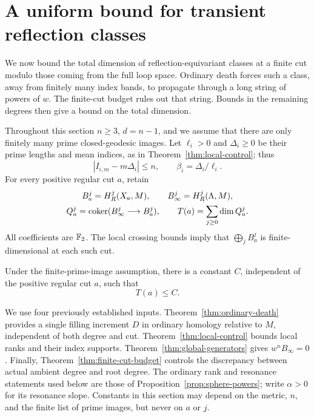 \section{A uniform bound for transient reflection classes}\label{sec:transients}

We now bound the total dimension of reflection-equivariant classes at a
finite cut modulo those coming from the full loop space.  Ordinary death
forces such a class, away from finitely many index bands, to propagate
through a long string of powers of $w$.  The finite-cut budget rules out
that string.  Bounds in the remaining degrees then give a bound on the
total dimension.

Throughout this section $n\ge3$, $d=n-1$, and we assume that there are
only finitely many prime closed-geodesic images.  Let $\ell_i>0$ and
$\Delta_i\ge0$ be their prime lengths and mean indices, as in
Theorem~\ref{thm:local-control}; thus
\begin{equation}\label{trans:index-slope}
 |I_{i,m}-m\Delta_i|\le n,
 \qquad \beta_i=\Delta_i/\ell_i.
\end{equation}
For every positive regular cut $a$, retain
\[
 \begin{gathered}
 B_a^j=H_R^j(X_a,M),\qquad B_\infty^j=H_R^j(\Lambda,M),\\
 Q_a^j=\operatorname{coker}(B_\infty^j\longrightarrow B_a^j),
 \qquad T(a)=\sum_{j\ge0}\dim Q_a^j.
 \end{gathered}
\]
All coefficients are $\mathbb F_2$.  The local crossing bounds imply that
$\bigoplus_j B_a^j$ is finite-dimensional at each such cut.

\begin{theorem}\label{thm:bounded-transients}
Under the finite-prime-image assumption, there is a constant $C$,
independent of the positive regular cut $a$, such that
\begin{equation}\label{trans:total-bound}
 T(a)\le C.
\end{equation}
\end{theorem}

We use four previously established inputs.  Theorem~\ref{thm:ordinary-death}
provides a single filling increment $D$ in ordinary homology relative
to $M$, independent of both degree and cut.
Theorem~\ref{thm:local-control} bounds local ranks and their index
supports.  Theorem~\ref{thm:global-generators} gives
$w^nB_\infty=0$.  Finally, Theorem~\ref{thm:finite-cut-budget}
controls the discrepancy between actual ambient degree and root degree.
The ordinary rank and resonance statements used below are those of
Proposition~\ref{prop:sphere-powers}; write $\alpha>0$ for its
resonance slope.  Constants in this section may depend on the metric,
$n$, and the finite list of prime images, but never on $a$ or $j$.

